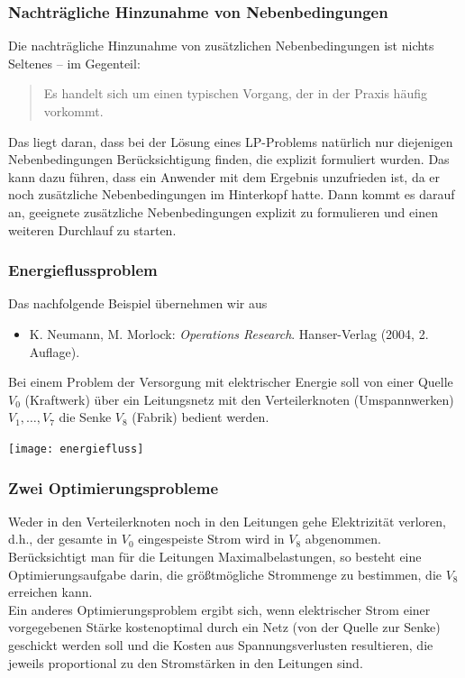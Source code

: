 \documentclass[smaller]{beamer}
\begin{document}
\begin{frame}
 \frametitle{Nachträgliche Hinzunahme von Nebenbedingungen}
 \alert{Die nachträgliche Hinzunahme von zusätzlichen Nebenbedingungen ist nichts Seltenes} -- im Gegenteil:
 \begin{quote}
 \alert{Es handelt sich um einen typischen Vorgang, der in der Praxis häufig vorkommt}.
 \end{quote}
 
 Das liegt daran, dass bei der Lösung eines LP-Problems natürlich nur diejenigen Nebenbedingungen Berücksichtigung finden, die explizit formuliert wurden. Das kann dazu führen, dass ein Anwender mit dem Ergebnis unzufrieden ist, da er noch zusätzliche Nebenbedingungen im Hinterkopf hatte. Dann kommt es darauf an, geeignete zusätzliche Nebenbedingungen explizit zu formulieren und einen weiteren Durchlauf zu starten.
\end{frame}

\begin{frame}
 \frametitle{Energieflussproblem}
 Das nachfolgende Beispiel übernehmen wir aus
\begin{itemize}
\item K. Neumann, M. Morlock: \textit{Operations Research}. Hanser-Verlag (2004, 2. Auflage).
\end{itemize}

Bei einem Problem der Versorgung mit elektrischer Energie soll von einer Quelle $V_0$ (Kraftwerk) über ein Leitungsnetz mit den Verteilerknoten (Umspannwerken) $V_1, \ldots, V_7$ die Senke $V_8$ (Fabrik) bedient werden. 

\begin{center}
\texttt{[image: energiefluss]}
\end{center}
\end{frame}

\begin{frame}
 \frametitle{Zwei Optimierungsprobleme}
 Weder in den Verteilerknoten noch in den Leitungen gehe Elektrizität verloren, d.h., der gesamte in $V_0$ eingespeiste Strom wird in $V_8$ abgenommen. \\ \vspace*{0.2cm}
 Berücksichtigt man für die Leitungen Maximalbelastungen, so besteht eine Optimierungsaufgabe darin, die größtmögliche Strommenge zu bestimmen, die $V_8$ erreichen kann. \\ \vspace*{0.2cm}
 Ein anderes Optimierungsproblem ergibt sich, wenn elektrischer Strom einer vorgegebenen Stärke kostenoptimal durch ein Netz (von der Quelle zur Senke) geschickt werden soll und die Kosten aus Spannungsverlusten resultieren, die jeweils proportional zu den Stromstärken in den Leitungen sind.
\end{frame}
\end{document}
